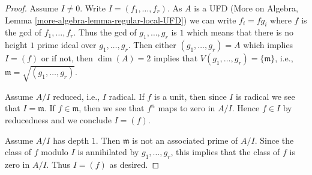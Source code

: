 \documentclass[10pt,a4paper]{amsart}
\theoremstyle{plain}
\theoremstyle{definition}
\theoremstyle{remark}
\numberwithin{equation}{subsection}
\begin{document}
\begin{proof}
Assume $I \not = 0$. Write $I = (f_1, \ldots, f_r)$. As $A$ is a UFD
(More on Algebra, Lemma \ref{more-algebra-lemma-regular-local-UFD})
we can write $f_i = fg_i$ where $f$ is the gcd of $f_1, \ldots, f_r$.
Thus the gcd of $g_1, \ldots, g_r$ is $1$ which means that
there is no height $1$ prime ideal over $g_1, \ldots, g_r$.
Then either $(g_1, \ldots, g_r) = A$ which implies $I = (f)$ or
if not, then $\dim(A) = 2$ implies that
$V(g_1, \ldots, g_r) = \{\mathfrak m\}$, i.e.,
$\mathfrak m = \sqrt{(g_1, \ldots, g_r)}$.

\medskip\noindent
Assume $A/I$ reduced, i.e., $I$ radical. If $f$ is a unit, then since $I$
is radical we see that $I = \mathfrak m$. If $f \in \mathfrak m$, then we
see that $f^n$ maps to zero in $A/I$. Hence $f \in I$ by reducedness and
we conclude $I = (f)$.

\medskip\noindent
Assume $A/I$ has depth $1$. Then $\mathfrak m$ is not an associated
prime of $A/I$. Since the class of $f$ modulo $I$ is annihilated
by $g_1, \ldots, g_r$, this implies that the class of $f$ is zero
in $A/I$. Thus $I = (f)$ as desired.
\end{proof}
\end{document}
